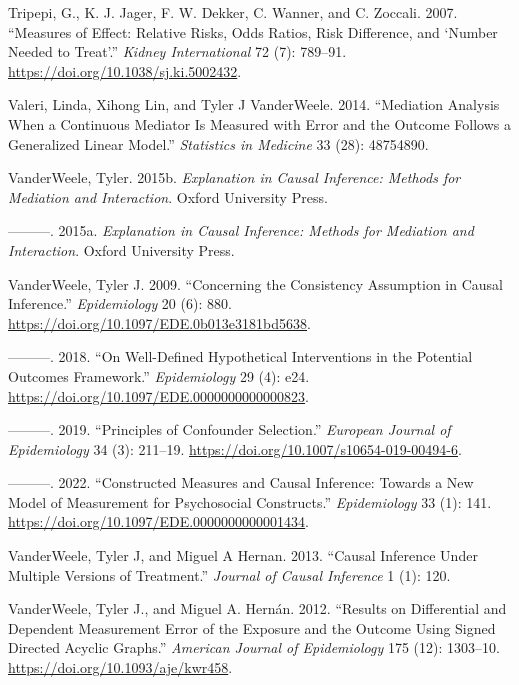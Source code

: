 \documentclass[
  singlecolumn]{report}
\newlength{\cslhangindent}
\newlength{\cslentryspacingunit} %
\newenvironment{CSLReferences}[2] %
 {%
  \setlength{\parindent}{0pt}
  \ifodd #1
  \let\oldpar\par
  \def\par{\hangindent=\cslhangindent\oldpar}
  \fi
  \setlength{\parskip}{#2\cslentryspacingunit}
 }%
 {}
\begin{document}
\begin{CSLReferences}{1}{0}
\leavevmode{}%
Tripepi, G., K. J. Jager, F. W. Dekker, C. Wanner, and C. Zoccali. 2007.
{``Measures of Effect: Relative Risks, Odds Ratios, Risk Difference, and
{`}Number Needed to Treat{'}.''} \emph{Kidney International} 72 (7):
789--91. \url{https://doi.org/10.1038/sj.ki.5002432}.

\leavevmode{}%
Valeri, Linda, Xihong Lin, and Tyler J VanderWeele. 2014. {``Mediation
Analysis When a Continuous Mediator Is Measured with Error and the
Outcome Follows a Generalized Linear Model.''} \emph{Statistics in
Medicine} 33 (28): 48754890.

\leavevmode{}%
VanderWeele, Tyler. 2015b. \emph{Explanation in Causal Inference:
Methods for Mediation and Interaction}. Oxford University Press.

\leavevmode{}%
---------. 2015a. \emph{Explanation in Causal Inference: Methods for
Mediation and Interaction}. Oxford University Press.

\leavevmode{}%
VanderWeele, Tyler J. 2009. {``Concerning the Consistency Assumption in
Causal Inference.''} \emph{Epidemiology} 20 (6): 880.
\url{https://doi.org/10.1097/EDE.0b013e3181bd5638}.

\leavevmode{}%
---------. 2018. {``On Well-Defined Hypothetical Interventions in the
Potential Outcomes Framework.''} \emph{Epidemiology} 29 (4): e24.
\url{https://doi.org/10.1097/EDE.0000000000000823}.

\leavevmode{}%
---------. 2019. {``Principles of Confounder Selection.''}
\emph{European Journal of Epidemiology} 34 (3): 211--19.
\url{https://doi.org/10.1007/s10654-019-00494-6}.

\leavevmode{}%
---------. 2022. {``Constructed Measures and Causal Inference: Towards a
New Model of Measurement for Psychosocial Constructs.''}
\emph{Epidemiology} 33 (1): 141.
\url{https://doi.org/10.1097/EDE.0000000000001434}.

\leavevmode{}%
VanderWeele, Tyler J, and Miguel A Hernan. 2013. {``Causal Inference
Under Multiple Versions of Treatment.''} \emph{Journal of Causal
Inference} 1 (1): 120.

\leavevmode{}%
VanderWeele, Tyler J., and Miguel A. Hernán. 2012. {``Results on
Differential and Dependent Measurement Error of the Exposure and the
Outcome Using Signed Directed Acyclic Graphs.''} \emph{American Journal
of Epidemiology} 175 (12): 1303--10.
\url{https://doi.org/10.1093/aje/kwr458}.


\end{CSLReferences}
\end{document}
